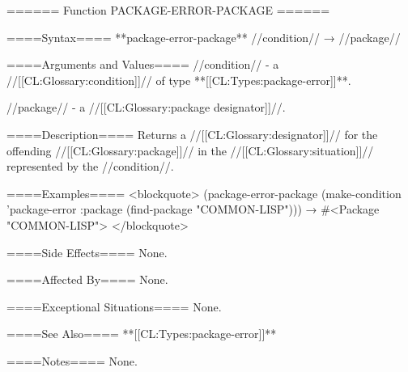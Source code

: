 ====== Function PACKAGE-ERROR-PACKAGE ======

====Syntax====
**package-error-package** //condition// → //package//

====Arguments and Values====
//condition// - a //[[CL:Glossary:condition]]// of type **[[CL:Types:package-error]]**.

//package// - a //[[CL:Glossary:package designator]]//.

====Description====
Returns a //[[CL:Glossary:designator]]// for the offending //[[CL:Glossary:package]]// in the //[[CL:Glossary:situation]]// represented by the //condition//.

====Examples====
<blockquote> (package-error-package (make-condition 'package-error :package (find-package "COMMON-LISP"))) → #<Package "COMMON-LISP"> </blockquote>

====Side Effects====
None.

====Affected By====
None.

====Exceptional Situations====
None.

====See Also====
**[[CL:Types:package-error]]**

====Notes====
None.

